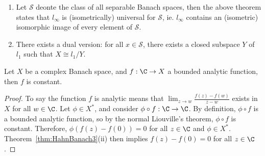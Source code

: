 \documentclass[a4paper]{article}
\begin{document}
\begin{remark}
  \begin{enumerate}[label=(\arabic*)]
    \item Let $\mathcal{S}$ deonte the class of all separable Banach spaces, then the above theorem states that $l_\infty$ is (isometrically) universal for $\mathcal{S}$, ie. $l_\infty$ contains an (isometric) isomorphic image of every element of $\mathcal{S}$.
    \item There exists a dual version: for all $x\in\mathcal{S}$, there exists a closed subspace $Y$ of $l_1$ such that $X\cong l_1/Y$.
  \end{enumerate}
\end{remark}

\begin{nthm}\label{thm:VectorLiouville}
  Let $X$ be a complex Banach space, and $f:\C\to X$ a bounded analytic function, then $f$ is constant.
\end{nthm}

\begin{proof}
  To say the function $f$ is analytic means that $\lim_{z\to w}\frac{f(z)-f(w)}{z-w}$ exists in $X$ for all $w\in\C$. Let $\phi\in X^*$, and consider $\phi\circ f:\C\to\C$. By definition, $\phi\circ f$ is a bounded analytic function, so by the normal Liouville's theorem, $\phi\circ f$ is constant. Therefore, $\phi(f(z)-f(0))=0$ for all $z\in\C$ and $\phi\in X^*$. Theorem~\ref{thm:HahnBanach3}(ii) then implies $f(z)-f(0)=0$ for all $z\in\C$.
\end{proof}
\end{document}
